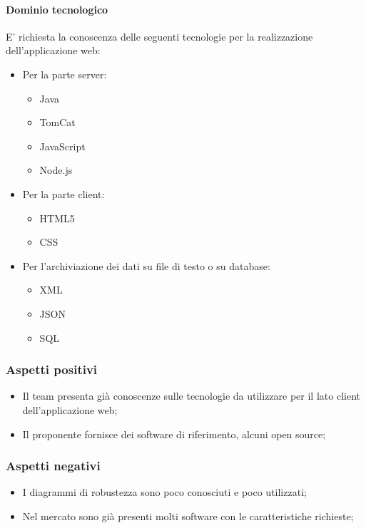 			\paragraph{Dominio tecnologico} \Spazio
			E' richiesta la conoscenza delle seguenti tecnologie per la realizzazione dell'applicazione web:
				\begin{itemize}
					\item Per la parte server:
					\begin{itemize}
						\item Java
						\item TomCat
						\item JavaScript
						\item Node.js
					\end{itemize}
					\item Per la parte client:
					\begin{itemize}
						\item HTML5
						\item CSS
					\end{itemize}
					\item Per l'archiviazione dei dati su file di testo o su database:
					\begin{itemize}
						\item XML
						\item JSON
						\item SQL
					\end{itemize}
				\end{itemize}
		\subsubsection{Aspetti positivi}
		\begin{itemize}
			\item Il team presenta già conoscenze sulle tecnologie da utilizzare per il lato client dell'applicazione web;
			\item Il proponente fornisce dei software di riferimento, alcuni open source;
		\end{itemize}
		\subsubsection{Aspetti negativi}
		\begin{itemize}
			\item I diagrammi di robustezza sono poco conosciuti e poco utilizzati;
			\item Nel mercato sono già presenti molti software con le caratteristiche richieste;
		\end{itemize}
